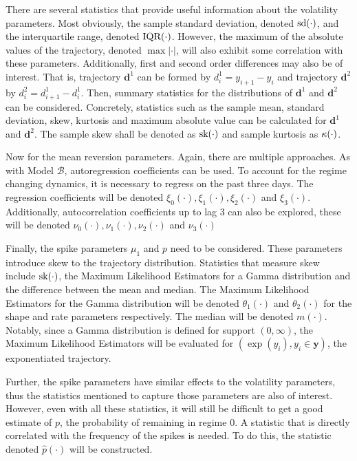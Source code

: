 There are several statistics that provide useful information about the volatility parameters. Most obviously, the sample standard deviation, denoted $\mathop{}\!\text{sd}{(\cdot)}$, and the interquartile range, denoted $\mathop{}\!\text{IQR}{(\cdot)}$. However, the maximum of the absolute values of the trajectory, denoted $\max{|\cdot|}$, will also exhibit some correlation with these parameters. Additionally, first and second order differences may also be of interest. That is, trajectory $\pmb{d}^1$ can be formed by $d^1_i = y_{i+1} - y_i$ and trajectory $\pmb{d}^2$ by $d^2_i = d^1_{i+1} - d^1_i$. Then, summary statistics for the distributions of $\pmb{d}^1$ and $\pmb{d}^2$ can be considered. Concretely, statistics such as the sample mean, standard deviation, skew, kurtosis and maximum absolute value can be calculated for $\pmb{d}^1$ and $\pmb{d}^2$. The sample skew shall be denoted as $\mathop{}\!\text{sk}{(\cdot)}$ and sample kurtosis as $\mathop{}\!\kappa{(\cdot)}$.

Now for the mean reversion parameters. Again, there are multiple approaches. As with Model $\mathcal{B}$, autoregression coefficients can be used. To account for the regime changing dynamics, it is necessary to regress on the past three days. The regression coefficients will be denoted $\xi_0(\cdot), \xi_1(\cdot), \xi_2(\cdot)$ and $\xi_3(\cdot)$. Additionally, autocorrelation coefficients up to lag 3 can also be explored, these will be denoted $\nu_0(\cdot), \nu_1(\cdot), \nu_2(\cdot)$ and $\nu_3(\cdot)$

Finally, the spike parameters $\mu_1$ and $p$ need to be considered. These parameters introduce skew to the trajectory distribution. Statistics that  measure skew include $\mathop{}\!\text{sk}{(\cdot)}$, the Maximum Likelihood Estimators for a Gamma distribution and the difference between the mean and median. The Maximum Likelihood Estimators for the Gamma distribution will be denoted $\theta_1(\cdot)$ and $\theta_2(\cdot)$ for the shape and rate parameters respectively. The median will be denoted $m(\cdot)$. Notably, since a Gamma distribution is defined for support $(0, \infty)$, the Maximum Likelihood Estimators will be evaluated for $(\exp(y_i), y_i \in \pmb{y})$, the exponentiated trajectory. 

Further, the spike parameters have similar effects to the volatility parameters, thus the statistics mentioned to capture those parameters are also of interest. However, even with all these statistics, it will still be difficult to get a good estimate of $p$, the probability of remaining in regime $0$. A statistic that is directly correlated with the frequency of the spikes is needed. To do this, the statistic denoted $\hat{p}(\cdot)$ will be constructed.

